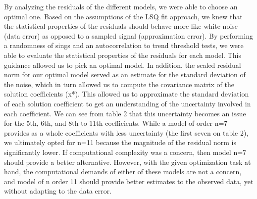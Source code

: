 By analyzing the residuals of the different models, we were able to choose an optimal one. Based on the assumptions of the LSQ fit approach, we knew that the statistical properties of the residuals should behave more like white noise (data error) as opposed to a sampled signal (approximation error). By performing a randomness of sings and an autocorrelation to trend threshold tests, we were able to evaluate the statistical properties of the residuals for each model. This guidance allowed us to pick an optimal model. In addition, the scaled residual norm for our optimal model served as an estimate for the standard deviation of the noise, which in turn allowed us to compute the covariance matrix of the solution coefficients (x*). This allowed us to approximate the standard deviation of each solution coefficient to get an understanding of the uncertainty involved in each coefficient. We can see from table 2 that this uncertainty becomes an issue for the 5th, 6th, and 8th to 11th coefficients. While a model of order n=7 provides as a whole coefficients with less uncertainty (the first seven on table 2), we ultimately opted for n=11 because the magnitude of the residual norm is significantly lower. If computational complexity was a concern, then model n=7 should provide a better alternative. However, with the given optimization task at hand, the computational demands of either of these models are not a concern, and model of n order 11 should provide better estimates to the observed data, yet without adapting to the data error.  